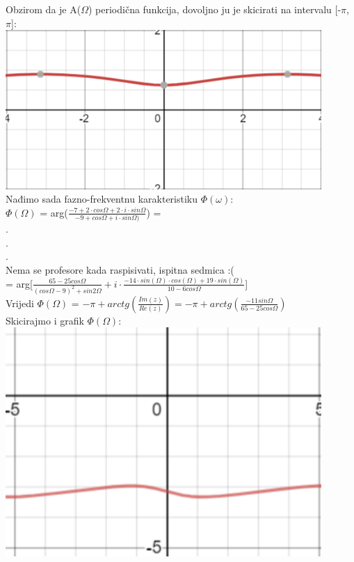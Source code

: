 \documentclass[12pt]{article}
\begin{document}
\begin{enumerate}
\begin{center}
	    \vspace{0.25cm}
	    Obzirom da je A($\Omega$) periodična funkcija, dovoljno ju je skicirati na intervalu [-$\pi$, $\pi$]:\\
	    \vspace{0.3cm}
	    \includegraphics[width=120mm]{grafA.png}\\
        \vspace{0.5cm}
	    Nađimo sada fazno-frekventnu karakteristiku $\Phi(\omega)$:\\
	    $\Phi(\Omega)$ = arg($\frac{-7 + 2 \cdot cos \Omega + 2 \cdot i \cdot sin \Omega}{-9 + cos \Omega + i \cdot sin \Omega)}$) = \\
	    .\\.\\. \\Nema se profesore kada raspisivati, ispitna sedmica :(\\
	    \vspace{0.3cm}
	    = arg[$\frac{65 - 25cos\Omega}{{(cos\Omega - 9)}^{2} + {sin}{2}\Omega} + i \cdot \frac{ - 14  \cdot sin(\Omega) \cdot cos(\Omega) + 19  \cdot sin(\Omega)}{10 - 6 cos \Omega}$]\\
	    Vrijedi
	    $\Phi(\Omega)$ = $-\pi + arctg(\frac{Im(z)}{Re(z)}) = -\pi + arctg (\frac{-11sin\Omega}{65 - 25cos\Omega})$\\
	    \vspace{0.25cm}
	    Skicirajmo i grafik  $\Phi(\Omega)$:\\
	     \includegraphics[width=120mm]{grafFi.png}\\

\end{center}
\end{enumerate}
\end{document}
